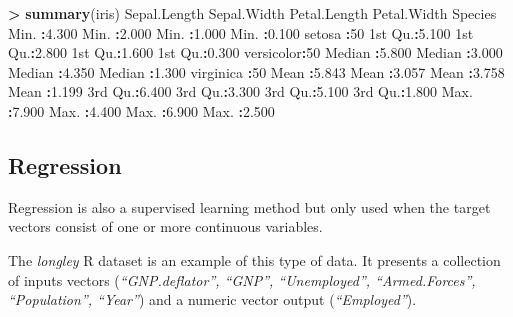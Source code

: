 \documentclass[]{book}
\newenvironment{Shaded}{\begin{snugshade}}{\end{snugshade}}
\newcommand{\KeywordTok}[1]{\textcolor[rgb]{0.13,0.29,0.53}{\textbf{#1}}}
\newcommand{\DecValTok}[1]{\textcolor[rgb]{0.00,0.00,0.81}{#1}}
\newcommand{\FloatTok}[1]{\textcolor[rgb]{0.00,0.00,0.81}{#1}}
\newcommand{\StringTok}[1]{\textcolor[rgb]{0.31,0.60,0.02}{#1}}
\newcommand{\OperatorTok}[1]{\textcolor[rgb]{0.81,0.36,0.00}{\textbf{#1}}}
\newcommand{\NormalTok}[1]{#1}
\begin{document}
\begin{Shaded}
\begin{Highlighting}[]
\OperatorTok{>}\StringTok{ }\KeywordTok{summary}\NormalTok{(iris)}
\NormalTok{  Sepal.Length    Sepal.Width     Petal.Length    Petal.Width          Species  }
\NormalTok{ Min.   }\OperatorTok{:}\FloatTok{4.300}\NormalTok{   Min.   }\OperatorTok{:}\FloatTok{2.000}\NormalTok{   Min.   }\OperatorTok{:}\FloatTok{1.000}\NormalTok{   Min.   }\OperatorTok{:}\FloatTok{0.100}\NormalTok{   setosa    }\OperatorTok{:}\DecValTok{50}  
\NormalTok{ 1st Qu.}\OperatorTok{:}\FloatTok{5.100}\NormalTok{   1st Qu.}\OperatorTok{:}\FloatTok{2.800}\NormalTok{   1st Qu.}\OperatorTok{:}\FloatTok{1.600}\NormalTok{   1st Qu.}\OperatorTok{:}\FloatTok{0.300}\NormalTok{   versicolor}\OperatorTok{:}\DecValTok{50}  
\NormalTok{ Median }\OperatorTok{:}\FloatTok{5.800}\NormalTok{   Median }\OperatorTok{:}\FloatTok{3.000}\NormalTok{   Median }\OperatorTok{:}\FloatTok{4.350}\NormalTok{   Median }\OperatorTok{:}\FloatTok{1.300}\NormalTok{   virginica }\OperatorTok{:}\DecValTok{50}  
\NormalTok{ Mean   }\OperatorTok{:}\FloatTok{5.843}\NormalTok{   Mean   }\OperatorTok{:}\FloatTok{3.057}\NormalTok{   Mean   }\OperatorTok{:}\FloatTok{3.758}\NormalTok{   Mean   }\OperatorTok{:}\FloatTok{1.199}                  
\NormalTok{ 3rd Qu.}\OperatorTok{:}\FloatTok{6.400}\NormalTok{   3rd Qu.}\OperatorTok{:}\FloatTok{3.300}\NormalTok{   3rd Qu.}\OperatorTok{:}\FloatTok{5.100}\NormalTok{   3rd Qu.}\OperatorTok{:}\FloatTok{1.800}                  
\NormalTok{ Max.   }\OperatorTok{:}\FloatTok{7.900}\NormalTok{   Max.   }\OperatorTok{:}\FloatTok{4.400}\NormalTok{   Max.   }\OperatorTok{:}\FloatTok{6.900}\NormalTok{   Max.   }\OperatorTok{:}\FloatTok{2.500}  
\end{Highlighting}
\end{Shaded}

\subsection{Regression}\label{regression}

Regression is also a supervised learning method but only used when the
target vectors consist of one or more continuous variables.

The \emph{longley} R dataset is an example of this type of data. It
presents a collection of inputs vectors (\emph{``GNP.deflator'',
``GNP'', ``Unemployed'', ``Armed.Forces'', ``Population'', ``Year''})
and a numeric vector output (\emph{``Employed''}).
\end{document}

